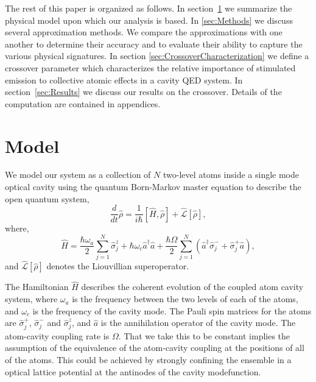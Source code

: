 \documentclass[aps,
twocolumn,
superscriptaddress,groupedaddress]{revtex4}
\begin{document}
The rest of this paper is organized as follows.  In
section~\ref{sec:Model} we summarize the physical model upon which our
analysis is based. In \ref{sec:Methods} we discuss several approximation
methods.  We compare the approximations with one another to determine
their accuracy and to evaluate their ability to capture the various
physical signatures. In section \ref{sec:CrossoverCharacterization} we
define a crossover parameter which characterizes the relative importance
of stimulated emission to collective atomic effects in a cavity QED
system.  In section~\ref{sec:Results} we discuss our results on the
crossover.  Details of the computation are contained in appendices.


\section{Model}
\label{sec:Model}

We model our system as a collection of $N$ two-level atoms inside a
single mode optical cavity using the quantum Born-Markov master equation
to describe the open quantum system,
\begin{equation}
  \frac{d}{dt} \hat{\rho} =
  \frac{1}{i \hbar} \left[ \hat{H}, \hat{\rho} \right] +
  \hat{\mathcal{L}}\left[ \hat{\rho} \right],
\label{ME1Crossover}
\end{equation}
where,
\begin{equation}
\hat{H} = \frac{\hbar \omega_a}{2} \sum_{j=1}^{N} \hat{\sigma}^{z}_{j}
+ \hbar \omega_c \hat{a}^{\dagger}\hat{a}
+ \frac{\hbar \Omega}{2}  \sum_{j=1}^{N} \left(
    \hat{a}^{\dagger} \hat{\sigma}^{-}_{j} +
    \hat{\sigma}^{+}_{j} \hat{a} \right),
\end{equation}
and $\hat{\mathcal{L}}\left[ \hat{\rho} \right]$ denotes the
Liouvillian superoperator.

The Hamiltonian $\hat{H}$ describes the coherent evolution of the
coupled atom cavity system, where $\omega_{a}$ is the frequency
between the two levels of each of the atoms, and $\omega_c$ is the
frequency of the cavity mode. The Pauli spin matrices for the atoms
are $\hat{\sigma}_j^{+}$, $\hat{\sigma}_j^{-}$ and
$\hat{\sigma}_j^{z}$, and $\hat{a}$ is the annihilation operator of
the cavity mode. The atom-cavity coupling rate is $\Omega$. That we
take this to be constant implies the assumption of the
equivalence of the atom-cavity coupling at the positions of all of the
atoms. This could be achieved by strongly confining the ensemble in a
optical lattice potential at the antinodes of the cavity modefunction.
\end{document}
